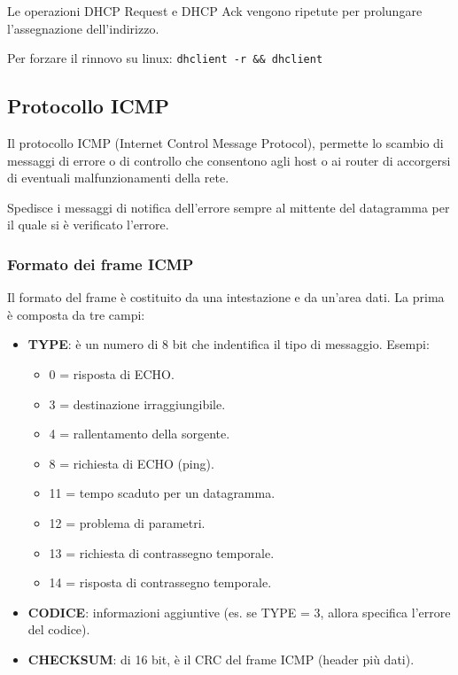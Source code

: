             Le operazioni DHCP Request e DHCP Ack vengono ripetute per prolungare l'assegnazione dell'indirizzo.
        
            Per forzare il rinnovo su linux: \verb:dhclient -r && dhclient:
    
    \subsection{Protocollo ICMP}
        Il protocollo ICMP (Internet Control Message Protocol), permette lo scambio di messaggi di errore o di controllo che consentono agli host o ai router di accorgersi di eventuali malfunzionamenti della rete.

        Spedisce i messaggi di notifica dell'errore sempre al mittente del datagramma per il quale si è verificato l'errore.

        \subsubsection{Formato dei frame ICMP}
            Il formato del frame è costituito da una intestazione e da un'area dati. La prima è composta da tre campi:
            \begin{itemize}
                \item \textbf{TYPE}: è un numero di 8 bit che indentifica il tipo di messaggio. Esempi:
                \begin{itemize}
                    \item 0 = risposta di ECHO.
                    \item 3 = destinazione irraggiungibile.
                    \item 4 = rallentamento della sorgente.
                    \item 8 = richiesta di ECHO (ping).
                    \item 11 = tempo scaduto per un datagramma.
                    \item 12 = problema di parametri.
                    \item 13 = richiesta di contrassegno temporale.
                    \item 14 = risposta di contrassegno temporale.
                \end{itemize}
                \item \textbf{CODICE}: informazioni aggiuntive (es. se TYPE = 3, allora specifica l'errore del codice).
                \item \textbf{CHECKSUM}: di 16 bit, è il CRC del frame ICMP (header più dati).
            \end{itemize}

